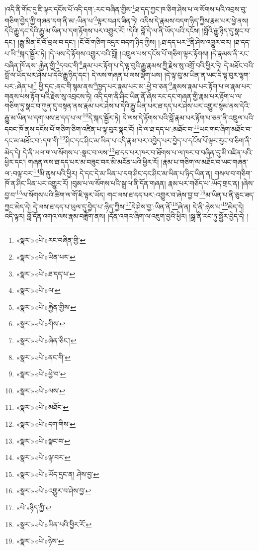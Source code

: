 །འདི་ནི་གོང་དུ་ཇི་ལྟར་དངོས་པོ་འདི་དག་:རང་བཞིན་གྱིས་\footnote{«སྣར་»«པེ་»རང་བཞིན་གྱི་}ཐ་དད་ཀྱང་ཁ་ཅིག་ཤེས་པ་ལ་སོགས་པའི་འབྲས་བུ་གཅིག་བྱེད་ཀྱི་གཞན་དག་ནི་མ་:ཡིན་པ་\footnote{«སྣར་»«པེ་»ཡིན་པར་}ལྟར་བཤད་ཟིན་ཏེ། འདིས་དེ་རྣམས་བདག་ཉིད་ཀྱིས་རྣམ་པར་ཕྱེ་ནས། དེའི་རྒྱུ་དང་དེའི་རྒྱུ་མ་ཡིན་པ་དག་རྟོགས་པར་འགྱུར་རོ། །དེའི། བློ་དེ་ལ་ནི་ཡོད་པའི་དངོས། །བློའི་རྒྱུ་ཉིད་དུ་སྣང་བ་དང་། །རྒྱུ་མིན་ངོ་བོ་བྲལ་བ་དང་། །ངོ་བོ་གཅིག་འདྲར་བདག་ཉིད་ཀྱིས། །:ཐ་དད་པར་\footnote{«སྣར་»«པེ་»ཐ་དད་པ་}ནི་ཤེས་འགྱུར་བར། །ཐ་དད་པ་ཡི་\footnote{«སྣར་»«པེ་»ལ་}སྐད་སྦྱོར་ཏེ། །དེ་ལས་དེ་རྟོགས་འགྱུར་བའི་བློ། །འཁྲུལ་པས་དངོས་པོ་གཅིག་ལྟར་རྟོགས། །དེ་རྣམས་ནི་རང་བཞིན་ཁོ་ནས་:རྐྱེན་གྱི་\footnote{«སྣར་»«པེ་»རྐྱེན་གྱིས་}དབང་གི་\footnote{«སྣར་»«པེ་»གིས་}རྣམ་པར་རྟོག་པ་དེ་ལྟ་བུའི་རྒྱུ་རྣམས་ཀྱི་རྗེས་སུ་འགྲོ་བའི་ཕྱིར་ཏེ། དེ་མཐོང་བའི་བློ་ལ་ཡོད་པར་ཤེས་པ་དེའི་རྒྱུ་ཉིད་དང་། དེ་ལས་གཞན་པ་ལས་ལྡོག་པས། །དེ་ལྟ་བུ་མ་ཡིན་ན་ཡང་དེ་ལྟ་བུར་ལྷག་པར་:ཞེན་པ།\footnote{«སྣར་»«པེ་»ཞེན་ཅིང་།} ཕྱི་དང་:ནང་གི་སྙམ་ནས་\footnote{«སྣར་»«པེ་»ནང་གི་}ཁྱད་པར་རྣམ་པར་མ་:ཕྱེ་བ་ཅན་\footnote{«སྣར་»«པེ་»ཕྱེ་བ་}རྣམས་རྣམ་པར་རྟོག་པ་ལ་རྣམ་པར་གནས་པས་རྟོག་པའི་རྗེས་སུ་འབྲངས་ཏེ། འདི་དག་ནི་ཤིང་ཡིན་ནོ་ཞེས་རང་དང་གཞན་གྱི་རྣམ་པར་རྟོག་པ་ལ་གཅིག་ཏུ་སྣང་བ་ཀུན་དུ་བསྟན་ནས་རྣམ་པར་ཤེས་པ་དེའི་རྒྱུ་ཡིན་པར་ཐ་དད་པར་ཤེས་པར་འགྱུར་སྙམ་ནས་དེའི་རྒྱུ་མ་ཡིན་པ་དག་ལས་ཐ་དད་པ་ལ་\footnote{«སྣར་»«པེ་»ལས་}དེ་སྐད་སྦྱོར་ཏེ། དེ་ལས་དེ་རྟོགས་པའི་བློ་རྣམ་པར་རྟོག་པ་ཅན་ནི་འཁྲུལ་པའི་དབང་ཁོ་ནས་དངོས་པོ་གཅིག་ཅིག་འཛིན་པ་ལྟ་བུར་སྣང་ངོ། །དེ་ལ་ཐ་དད་པ་:མཐོང་བ་\footnote{«སྣར་»«པེ་»མཐོང་}ཡང་གང་ཞིག་མཐོང་བ་དང་མ་མཐོང་བ་:དག་གི་\footnote{«སྣར་»«པེ་»དག་གིས་}ཤིང་དང་ཤིང་མ་ཡིན་པ་འདི་རྣམ་པར་འབྱེད་པར་བྱེད་པ་དངོས་པོ་ལྟར་རུང་བ་ཅིག་ནི་མེད་དེ། དེ་ནི་ཡལ་ག་ལ་སོགས་པ་:སྣང་བ་ལས་\footnote{«སྣར་»«པེ་»སྣང་བ་}ཐ་དད་པར་ཁར་བ་ཐོགས་པ་ལ་ཁར་བ་བཞིན་དུ་མི་འཛིན་པའི་ཕྱིར་དང་། གཞན་ལས་ཐ་དད་པར་མ་བཟུང་བར་མི་མངོན་པའི་ཕྱིར་རོ། །རྣམ་པ་གཅིག་ལ་མཐོང་བ་ཡང་གཞན་ལ་:བལྟ་བར་\footnote{«སྣར་»«པེ་»ལྟ་བར་}མི་ནུས་པའི་ཕྱིར། དེ་དང་དེ་མ་ཡིན་པ་དག་ཤིང་དང་ཤིང་མ་ཡིན་པ་ཉིད་ཡིན་ན། གསལ་བ་གཅིག་ཁོ་ན་ཤིང་ཡིན་པར་འགྱུར་རོ། །བུམ་པ་ལ་སོགས་པའི་སྒྲ་ལ་ནི་དོན་གཞན། རྣམ་པར་གཅོད་པ་:ཡོད་གྲང་ན། །ཞེས་བྱ་བ་\footnote{«སྣར་»«པེ་»ཡོད་དྲང་ན། ཤེས་བྱ་}ལ་སོགས་པའི་ཚིག་ལ་གོ་ཇི་ལྟར་ཡོད། གང་ལས་ཐ་དད་པར་:འགྱུར་བ་ཞེས་བྱ་བ་\footnote{«སྣར་»«པེ་»འགྱུར་བ་ཤེས་བྱ་}མ་ཡིན་པ་ནི་ཅུང་ཟད་ཀྱང་མེད་དེ། དེ་ལས་ཐ་དད་པ་ཡུལ་དུ་བྱེད་པ་:ཉིད་ཀྱིས་\footnote{«པེ་»ཉིད་ཀྱི་}དེ་ཤེས་བྱ་:ཡིན་ནོ་\footnote{«སྣར་»«པེ་»ཡིན་པའི་ཕྱིར་རོ་}ཞེ་ན། དེ་ནི་:ཉེས་པ་\footnote{«སྣར་»«པེ་»ཉེས་}མེད་དེ། འདི་ལྟར། བློ་དོན་འགའ་ལས་རྣམ་བཟློག་ནས། །དོན་འགའ་ཞིག་ལ་འཇུག་བྱའི་ཕྱིར། །སྒྲ་ནི་རབ་ཏུ་སྦྱོར་བྱེད་དེ། །
